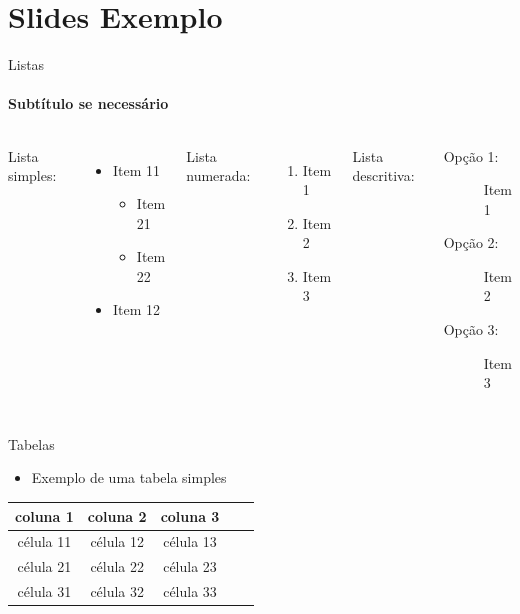 \documentclass[
aspectratio=169,	%
LEEC,				%
portuguese,			%
]{DEEclassP}
\begin{document}
\section{Slides Exemplo}

\begin{frame}{Listas}
\framesubtitle{Subtítulo se necessário}

\begin{columns}

Lista simples:
\begin{itemize}
	\item Item 11
    \begin{itemize}
    	\item Item 21
  	    \item Item 22
  	\end{itemize}
  	\item Item 12
\end{itemize}  	    

Lista numerada:
\begin{enumerate}
	\item Item 1
    \item Item 2
  	\item Item 3
\end{enumerate} 

Lista descritiva:
\begin{description}
	\item [Opção 1:] Item 1
	\item [Opção 2:] Item 2
	\item [Opção 3:] Item 3
\end{description}
	
\end{columns}

\end{frame}

\begin{frame}{Tabelas}

\begin{itemize}
	\item Exemplo de uma tabela simples 	
\end{itemize}	
  
\begin{table}[h]							 
	\centering
	\begin{tabular}{ccccc}
	\toprule
	\textbf{coluna 1} & \textbf{coluna 2} & \textbf{coluna 3}\\
	\midrule
		célula 11 & célula 12 & célula 13\\ 
    	célula 21 & célula 22 & célula 23\\  
    	célula 31 & célula 32 & célula 33\\  
	\bottomrule
	\end{tabular}
\end{table}
    
\end{frame}
	
\end{document}

